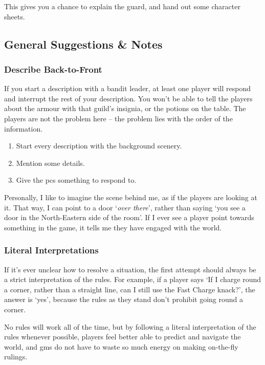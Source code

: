 \begin{multicols}{2}
This gives you a chance to explain the \gls{guard}, and hand out some character sheets.

\subsection{General Suggestions \& Notes}

\subsubsection{Describe Back-to-Front}

If you start a description with a bandit leader, at least one player will respond and interrupt the rest of your description.
You won't be able to tell the players about the armour with that guild's insignia, or the potions on the table.
The players are not the problem here -- the problem lies with the order of the information.

\begin{enumerate}
  \item
  Start every description with the background scenery.
  \item
  Mention some details.
  \item
  Give the \glspl{pc} something to respond to.
\end{enumerate}

\noindent
Personally, I like to imagine the scene behind me, as if the players are looking at it.
That way, I can point to a door `\emph{over there}', rather than saying `you see a door in the North-Eastern side of the room'.
If I ever see a player point towards something in the game, it tells me they have engaged with the world.

\subsubsection{Literal Interpretations}

If it's ever unclear how to resolve a situation, the first attempt should always be a strict interpretation of the rules.
For example, if a player says `If I charge round a corner, rather than a straight line, can I still use the Fast Charge knack?', the answer is `yes', because the rules as they stand don't prohibit going round a corner.

No rules will work all of the time, but by following a literal interpretation of the rules whenever possible, players feel better able to predict and navigate the world, and \glspl{gm} do not have to waste so much energy on making on-the-fly rulings.


\end{multicols}
